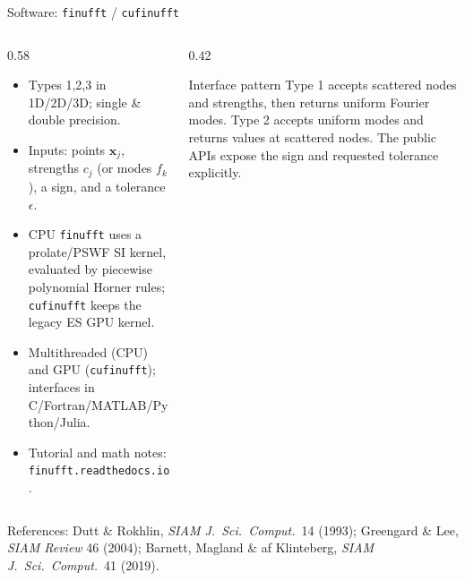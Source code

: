 \documentclass[aspectratio=169,11pt]{beamer}
\newcommand{\x}{\bm{x}}
\newcommand{\gray}[1]{{\color{mygray}#1}}
\begin{document}
\begin{frame}{Software: \texttt{finufft} / \texttt{cufinufft}}
\small
\begin{columns}[T,totalwidth=\textwidth]
\begin{column}{0.58\textwidth}
\begin{itemize}
  \item Types 1,2,3 in 1D/2D/3D; single \& double precision.
  \item Inputs: points \(\x_j\), strengths \(c_j\) (or modes \(f_k\)), a sign,
  and a tolerance \(\epsilon\).
  \item CPU \texttt{finufft} uses a prolate/PSWF SI kernel, evaluated by piecewise polynomial Horner rules; \texttt{cufinufft} keeps the legacy ES GPU kernel.
  \item Multithreaded (CPU) and GPU (\texttt{cufinufft}); interfaces in C/Fortran/MATLAB/Python/Julia.
  \item Tutorial and math notes: \texttt{finufft.readthedocs.io}.
\end{itemize}
\end{column}
\begin{column}{0.42\textwidth}
\footnotesize
\begin{block}{Interface pattern}
Type 1 accepts scattered nodes and strengths, then returns uniform Fourier modes. Type 2 accepts uniform modes and returns values at scattered nodes. The public APIs expose the sign and requested tolerance explicitly.
\end{block}
\end{column}
\end{columns}
\vspace{1mm}
{\scriptsize\gray{References: Dutt \& Rokhlin, \emph{SIAM J.\ Sci.\ Comput.}\ 14 (1993); Greengard \& Lee, \emph{SIAM Review} 46 (2004); Barnett, Magland \& af Klinteberg, \emph{SIAM J.\ Sci.\ Comput.}\ 41 (2019).}}
\end{frame}
\end{document}

